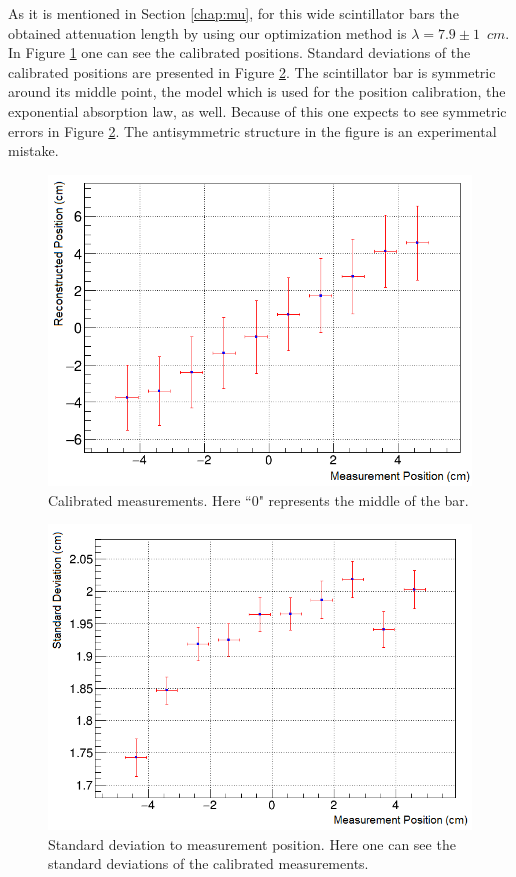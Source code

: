 \documentclass[a4paper]{article}\linespread{1.4}
\begin{document}
As it is mentioned in Section \ref{chap:mu}, for this wide scintillator bars the obtained attenuation length by using our optimization method is $\lambda=7.9\pm1$~$cm$. In Figure \ref{fig:pro1} one can see the calibrated positions. 
Standard deviations of the calibrated positions are presented in Figure \ref{fig:pro2}. 
The scintillator bar is symmetric around its middle point, the model which is used for the position calibration, the exponential absorption law, as well. Because of this one expects to see symmetric errors in Figure \ref{fig:pro2}. The antisymmetric structure in the figure is an experimental mistake.
\begin{figure}[] \hspace*{-0cm} \includegraphics[width=120mm,scale=2.0]{pro1.png} \caption{Calibrated measurements. Here ``0" represents the middle of the bar.}  \label{fig:pro1}\end{figure}
\begin{figure}[] \hspace*{-0cm} \includegraphics[width=120mm,scale=2.0]{pro2.png} \caption{Standard deviation to measurement position. Here one can see the standard deviations of the calibrated measurements.}  \label{fig:pro2}\end{figure}
\end{document}
